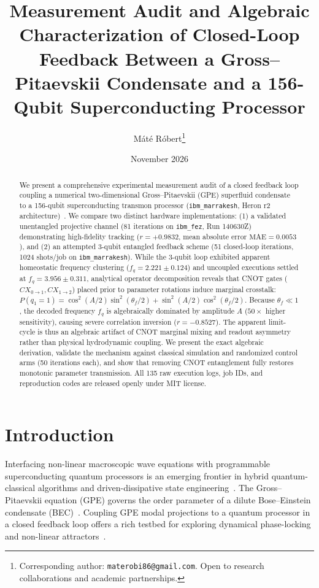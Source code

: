 \documentclass[11pt,a4paper]{article}
\title{\textbf{Measurement Audit and Algebraic Characterization of Closed-Loop Feedback Between a Gross--Pitaevskii Condensate and a 156-Qubit Superconducting Processor}}
\author{M\'at\'e R\'obert\thanks{Corresponding author: \texttt{materobi86@gmail.com}. Open to research collaborations and academic partnerships.}}
\affil{Hungary \\ \texttt{ORCID: 0009-0003-3986-6039}}
\date{November 2026}
\begin{document}
\maketitle

\begin{abstract}
We present a comprehensive experimental measurement audit of a closed feedback loop coupling a numerical two-dimensional Gross--Pitaevskii (GPE) superfluid condensate~\cite{pitaevskii2003bec,dalfovo1999bec} to a 156-qubit superconducting transmon processor (\texttt{ibm\_marrakesh}, Heron r2 architecture)~\cite{heron2024,krantz_guide}. We compare two distinct hardware implementations: (1) a validated unentangled projective channel (81 iterations on \texttt{ibm\_fez}, Run 140630Z) demonstrating high-fidelity tracking ($r = +0.9832$, mean absolute error $\text{MAE} = 0.0053$), and (2) an attempted 3-qubit entangled feedback scheme (51 closed-loop iterations, 1024 shots/job on \texttt{ibm\_marrakesh}). While the 3-qubit loop exhibited apparent homeostatic frequency clustering ($f_q = 2.221 \pm 0.124$) and uncoupled executions settled at $f_q = 3.956 \pm 0.311$, analytical operator decomposition reveals that CNOT gates ($CX_{0 \to 1}, CX_{1 \to 2}$) placed prior to parameter rotations induce marginal crosstalk: $P(q_1=1) = \cos^2(A/2)\sin^2(\theta_f/2) + \sin^2(A/2)\cos^2(\theta_f/2)$. Because $\theta_f \ll 1$, the decoded frequency $f_q$ is algebraically dominated by amplitude $A$ ($50\times$ higher sensitivity), causing severe correlation inversion ($r = -0.8527$). The apparent limit-cycle is thus an algebraic artifact of CNOT marginal mixing and readout asymmetry rather than physical hydrodynamic coupling. We present the exact algebraic derivation, validate the mechanism against classical simulation and randomized control arms (50 iterations each), and show that removing CNOT entanglement fully restores monotonic parameter transmission. All 135 raw execution logs, job IDs, and reproduction codes are released openly under MIT license.
\end{abstract}

\section{Introduction}

Interfacing non-linear macroscopic wave equations with programmable superconducting quantum processors is an emerging frontier in hybrid quantum-classical algorithms and driven-dissipative state engineering~\cite{peruzzo2014vqe,mcardle2020quantum,blais_cqed}. The Gross--Pitaevskii equation (GPE) governs the order parameter of a dilute Bose--Einstein condensate (BEC)~\cite{pitaevskii2003bec,dalfovo1999bec}. Coupling GPE modal projections to a quantum processor in a closed feedback loop offers a rich testbed for exploring dynamical phase-locking and non-linear attractors~\cite{bao2013gpe,weimer2010rydberg}.
\end{document}
